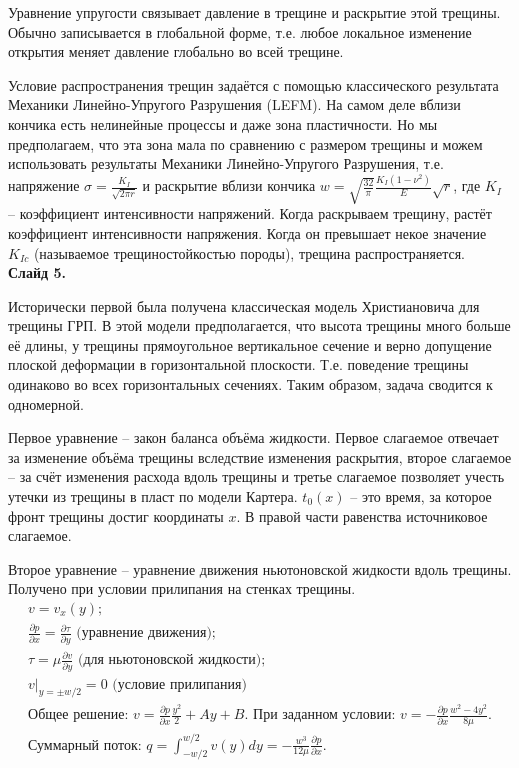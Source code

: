 \documentclass[a4paper, 12pt]{article}
\newcommand{\beq}{\begin{equation}}
\newcommand{\eeq}{\end{equation}}
\begin{document}
Уравнение упругости связывает давление в трещине и раскрытие этой трещины.
Обычно записывается в глобальной форме, т.е. любое локальное изменение открытия меняет давление глобально во всей трещине.

Условие распространения трещин задаётся с помощью классического результата Механики Линейно-Упругого Разрушения (LEFM).
На самом деле вблизи кончика есть нелинейные процессы и даже зона пластичности.
Но мы предполагаем, что эта зона мала по сравнению с размером трещины и можем использовать результаты Механики Линейно-Упругого Разрушения, т.е. напряжение $\sigma=\frac{K_I}{\sqrt{2\pi r}}$ и раскрытие вблизи кончика $w=\sqrt{\frac{32}{\pi}}\frac{K_{I}\left(1-\nu^2\right)}{E}\sqrt{r}$, где $K_I$ -- коэффициент интенсивности напряжений.
Когда раскрываем трещину, растёт коэффициент интенсивности напряжения.
Когда он превышает некое значение $K_{Ic}$ (называемое трещиностойкостью породы), трещина распространяется.\\

\textbf{Слайд 5.}

Исторически первой была получена классическая модель Христиановича для трещины ГРП.
В этой модели предполагается, что высота трещины много больше её длины, у трещины прямоугольное вертикальное сечение и верно допущение плоской деформации в горизонтальной плоскости.
Т.е. поведение трещины одинаково во всех горизонтальных сечениях.
Таким образом, задача сводится к одномерной.

Первое уравнение -- закон баланса объёма жидкости.
Первое слагаемое отвечает за изменение объёма трещины вследствие изменения раскрытия, второе слагаемое -- за счёт изменения расхода вдоль трещины и третье слагаемое позволяет учесть утечки из трещины в пласт по модели Картера.
$t_0(x)$ -- это время, за которое фронт трещины достиг координаты $x$.
В правой части равенства источниковое слагаемое.

Второе уравнение -- уравнение движения ньютоновской жидкости вдоль трещины.
Получено при условии прилипания на стенках трещины.
\beq
\begin{gathered}
v=v_x(y);\\
\frac{\partial p}{\partial x}=\frac{\partial\tau}{\partial y}\text{ (уравнение движения)};\\
\tau=\mu\frac{\partial v}{\partial y}\text{ (для ньютоновской жидкости)};\\
v|_{y=\pm w/2}=0\text{ (условие прилипания)}\\
\text{Общее решение: }v=\frac{\partial p}{\partial x}\frac{y^2}{2}+Ay+B.\text{ При заданном условии: }v=-\frac{\partial p}{\partial x}\frac{w^2-4y^2}{8\mu}.\\
\text{Суммарный поток: }q=\int_{-w/2}^{w/2}{v(y)}dy=-\frac{w^3}{12\mu}\frac{\partial p}{\partial x}.
\end{gathered}
\eeq
\end{document}
